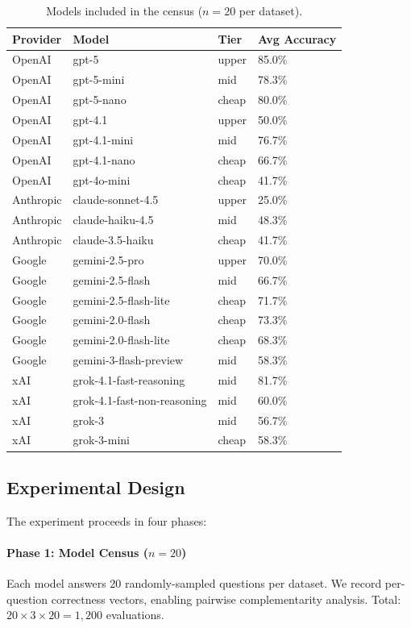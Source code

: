 \documentclass[11pt,a4paper]{article}
\begin{document}
\begin{table}[htbp]
\centering
\caption{Models included in the census ($n=20$ per dataset).}
\label{tab:models}
\small
\begin{tabular}{llll}
\toprule
\textbf{Provider} & \textbf{Model} & \textbf{Tier} & \textbf{Avg Accuracy} \\
\midrule
OpenAI & gpt-5 & upper & 85.0\% \\
OpenAI & gpt-5-mini & mid & 78.3\% \\
OpenAI & gpt-5-nano & cheap & 80.0\% \\
OpenAI & gpt-4.1 & upper & 50.0\% \\
OpenAI & gpt-4.1-mini & mid & 76.7\% \\
OpenAI & gpt-4.1-nano & cheap & 66.7\% \\
OpenAI & gpt-4o-mini & cheap & 41.7\% \\
\midrule
Anthropic & claude-sonnet-4.5 & upper & 25.0\% \\
Anthropic & claude-haiku-4.5 & mid & 48.3\% \\
Anthropic & claude-3.5-haiku & cheap & 41.7\% \\
\midrule
Google & gemini-2.5-pro & upper & 70.0\% \\
Google & gemini-2.5-flash & mid & 66.7\% \\
Google & gemini-2.5-flash-lite & cheap & 71.7\% \\
Google & gemini-2.0-flash & cheap & 73.3\% \\
Google & gemini-2.0-flash-lite & cheap & 68.3\% \\
Google & gemini-3-flash-preview & mid & 58.3\% \\
\midrule
xAI & grok-4.1-fast-reasoning & mid & 81.7\% \\
xAI & grok-4.1-fast-non-reasoning & mid & 60.0\% \\
xAI & grok-3 & mid & 56.7\% \\
xAI & grok-3-mini & cheap & 58.3\% \\
\bottomrule
\end{tabular}
\end{table}

\subsection{Experimental Design}

The experiment proceeds in four phases:

\paragraph{Phase 1: Model Census ($n=20$)}
Each model answers 20 randomly-sampled questions per dataset.
We record per-question correctness vectors, enabling pairwise complementarity analysis.
Total: $20 \times 3 \times 20 = 1{,}200$ evaluations.
\end{document}
